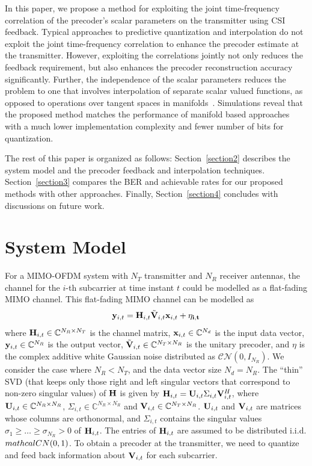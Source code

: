 \documentclass[journal,10pt,twocolumn]{IEEEtran}
\def\bx{{\bf x}}
\def\by{{\bf y}}
\def\bH{{\bf H}}
\def\bU{{\bf U}}
\def\bV{{\bf V}}
\begin{document}
In this paper, we propose a method for exploiting the joint
time-frequency correlation of the precoder's scalar parameters on the
transmitter using CSI feedback. Typical approaches to predictive
quantization and interpolation do not exploit the joint time-frequency
correlation to enhance the precoder estimate at the
transmitter. However, exploiting the correlations jointly not only
reduces the feedback requirement, but also enhances the precoder
reconstruction accuracy significantly. Further, the independence of
the scalar parameters reduces the problem to one that involves
interpolation of separate scalar valued functions, as opposed to
operations over tangent spaces in
manifolds~\cite{Gupt1905:Predictive}. Simulations reveal that the
proposed method matches the performance of manifold based approaches
with a much lower implementation complexity and fewer number of bits
for quantization.


The rest of this paper is organized as follows: Section~\ref{section2} describes the system model and the precoder feedback and interpolation techniques. Section~\ref{section3} compares the BER and achievable rates for our proposed methods with other approaches. Finally, Section~\ref{section4} concludes with discussions on future work.

\section{System Model}
For a MIMO-OFDM system with $N_T$ transmitter and $N_R$ receiver
antennas, the channel for the $i$-th subcarrier at time instant $t$ could be modelled as a flat-fading MIMO channel. This flat-fading MIMO channel can be modelled as
\label{section2}
\begin{equation}
\by_{i,t} = \bH_{i,t}\tilde{\bV}_{i,t} \bx_{i,t}+ \bf{\eta_{i,t}}
\end{equation}
where $\bH_{i,t} \in \mathbb{C}^{N_R \times N_T}$ is the channel
matrix, $\bx_{i,t} \in \mathbb{C}^{N_d}$ is the input data vector,
$\by_{i,t} \in \mathbb{C}^{N_R}$ is the output vector,
$\tilde{\bV}_{i,t} \in \mathbb{C}^{N_T \times N_R}$ is the unitary
precoder, and $\eta$ is the complex additive white Gaussian noise
distributed as ${\mathcal{CN}}(0,I_{N_R})$. We consider the case where
$N_R < N_T$, and the data vector size $N_d = N_R$.  The ``thin'' SVD
(that keeps only those right and left singular vectors that correspond
to non-zero singular values) of $\bH$ is given by
$\bH_{i,t} = \bU_{i,t} \Sigma_{i,t} \bV_{i,t}^{H}$, where
$\bU_{i,t} \in \mathbb{C}^{N_R \times N_R}$,
$\Sigma_{i,t} \in \mathbb{C}^{N_R \times N_R}$ and
$\bV_{i,t} \in \mathbb{C}^{N_T \times N_R}$. $\bU_{i,t}$ and
$\bV_{i,t}$ are matrices whose columns are orthonormal, and
$\Sigma_{i,t}$ contains the singular values
$\sigma_1 \geq \ldots \geq \sigma_{N_R} > 0$ of $\bH_{i,t}$. The
entries of $\bH_{i,t}$ are assumed to be distributed
i.i.d. $\\mathcal{CN}(0,1)$. To obtain a precoder at the
transmitter, we need to quantize and feed back information about
$\bV_{i,t}$ for each subcarrier.
\end{document}

